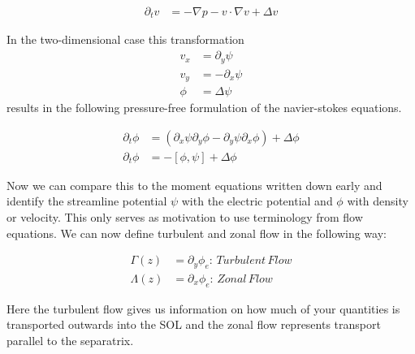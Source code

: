 \begin{align}
    \partial_t v &= - \nabla p - v \cdot \nabla v + \Delta v
\end{align}

In the two-dimensional case this transformation
\begin{align}
    v_x &= \partial_y \psi \\
    v_y &= -\partial_x \psi \\
    \phi &= \Delta \psi
\end{align}
results in the following pressure-free formulation of the navier-stokes equations.

\begin{align}
    \partial_t \phi &= \left( \partial_x \psi \partial_y \phi - \partial_y \psi \partial_x \phi  \right) + \Delta \phi\\
    \partial_t \phi &= - \left[\phi, \psi\right] + \Delta \phi
\end{align}

Now we can compare this to the moment equations written down early and identify the streamline potential $\psi$ with the electric potential and $\phi$ with density or velocity. This only serves as motivation to use terminology from flow equations. We can now define turbulent and zonal flow in the following way:

\begin{align}
    \Gamma(z) &= \partial_y \phi_e :\, Turbulent\,Flow\\
    \Lambda(z) &= \partial_x \phi_e :\, Zonal\,Flow
\end{align}

Here the turbulent flow gives us information on how much of your quantities is transported outwards into the SOL and the zonal flow represents transport parallel to the separatrix.